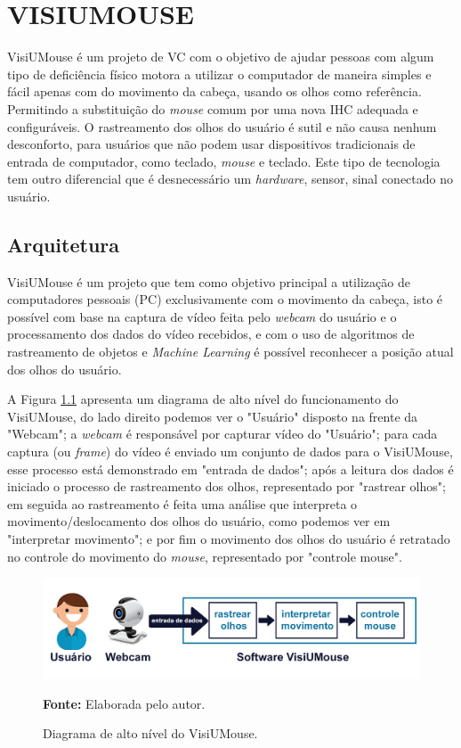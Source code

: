 \chapter{VISIUMOUSE}\label{CAP4}
VisiUMouse é um projeto de VC com o objetivo de ajudar pessoas com algum tipo de deficiência físico motora a utilizar o computador de maneira simples e fácil apenas com do movimento da cabeça, usando os olhos como referência. Permitindo a substituição do \textit{mouse} comum por uma nova IHC adequada e configuráveis. O rastreamento dos olhos do usuário é sutil e não causa nenhum desconforto, para usuários que não podem usar dispositivos tradicionais de entrada de computador, como teclado, \textit{mouse} e teclado. Este tipo de tecnologia tem outro diferencial que é desnecessário um \textit{hardware}, sensor, sinal conectado no usuário.

\section{Arquitetura}\label{Sub:funcionamento-visiumouse}
VisiUMouse é um projeto que tem como objetivo principal a utilização de computadores pessoais (PC) exclusivamente com o movimento da cabeça, isto é possível com base na captura de vídeo feita pelo \textit{webcam} do usuário e o processamento dos dados do vídeo recebidos, e com o uso de algoritmos de rastreamento de objetos e \textit{Machine Learning} é possível reconhecer a posição atual dos olhos do usuário. 

A Figura \ref{fig:projeto-diagrama-alto-nivel} apresenta um diagrama de alto nível do funcionamento do VisiUMouse, do lado direito podemos ver o "Usuário" disposto na frente da "Webcam"; a \textit{webcam} é responsável por capturar vídeo do "Usuário"; para cada captura (ou \textit{frame}) do vídeo é enviado um conjunto de dados para o VisiUMouse, esse processo está demonstrado em "entrada de dados";  após a leitura dos dados é iniciado o processo de rastreamento dos olhos, representado por "rastrear olhos"; em seguida ao rastreamento é feita uma análise que interpreta o movimento/deslocamento dos olhos do usuário, como podemos ver em "interpretar movimento"; e por fim o movimento dos olhos do usuário é retratado no controle do movimento do \textit{mouse}, representado por "controle mouse".

\begin{figure}[htbp]
\centering
\caption{Diagrama de alto nível do VisiUMouse.}
\includegraphics[scale=.25]{img/projeto-diagrama-alto-nivel.png}

  \textbf{Fonte:} Elaborada pelo autor.
\label{fig:projeto-diagrama-alto-nivel}
\end{figure}

